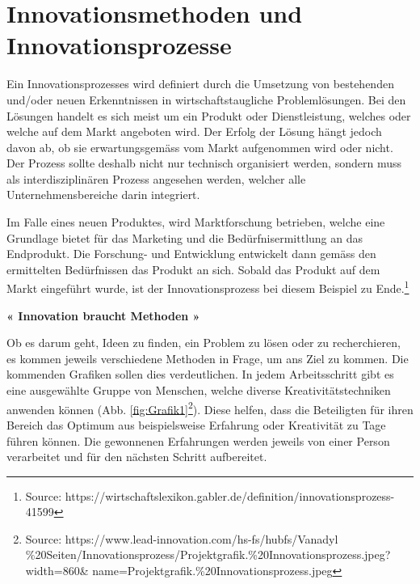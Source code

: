 \section{Innovationsmethoden und Innovationsprozesse}


Ein Innovationsprozesses wird definiert durch die Umsetzung von bestehenden und/oder neuen Erkenntnissen in wirtschaftstaugliche Problemlösungen. Bei den Lösungen handelt es sich meist um ein Produkt oder Dienstleistung, welches oder welche auf dem Markt angeboten wird. Der Erfolg der Lösung hängt jedoch davon ab, ob sie erwartungsgemäss vom Markt aufgenommen wird oder nicht. Der Prozess sollte deshalb nicht nur technisch organisiert werden, sondern muss als interdisziplinären Prozess angesehen werden, welcher alle Unternehmensbereiche darin integriert.

Im Falle eines neuen Produktes, wird Marktforschung betrieben, welche eine Grundlage bietet für das Marketing und die Bedürfnisermittlung an das Endprodukt. Die Forschung- und Entwicklung entwickelt dann gemäss den ermittelten Bedürfnissen das Produkt an sich. Sobald das Produkt auf dem Markt eingeführt wurde, ist der Innovationsprozess bei diesem Beispiel zu Ende.\footnote{Source: https://wirtschaftslexikon.gabler.de/definition/innovationsprozess-41599}



\textbf{« Innovation braucht Methoden »}

Ob es darum geht, Ideen zu finden, ein Problem zu lösen oder zu recherchieren, es kommen jeweils verschiedene Methoden in Frage, um ans Ziel zu kommen. Die kommenden Grafiken sollen dies verdeutlichen. In jedem Arbeitsschritt gibt es eine ausgewählte Gruppe von Menschen, welche diverse Kreativitätstechniken anwenden können (Abb. \ref{fig:Grafik1}\footnote{Source: https://www.lead-innovation.com/hs-fs/hubfs/Vanadyl \%20Seiten/Innovationsprozess/Projektgrafik.\%20Innovationsprozess.jpeg?width=860\& name=Projektgrafik.\%20Innovationsprozess.jpeg}). Diese helfen, dass die Beteiligten für ihren Bereich das Optimum aus beispielsweise Erfahrung oder Kreativität zu Tage führen können. Die gewonnenen Erfahrungen werden jeweils von einer Person verarbeitet und für den nächsten Schritt aufbereitet.

